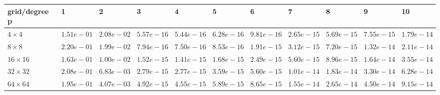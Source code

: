 \begin{tabular}{lllllllllll}
\hline
 grid/degree p   & 1          & 2          & 3          & 4          & 5          & 6          & 7          & 8          & 9          & 10         \\
\hline
 $4 \times 4$    & $1.51e-01$ & $2.08e-02$ & $5.57e-16$ & $5.44e-16$ & $6.28e-16$ & $9.81e-16$ & $2.65e-15$ & $5.69e-15$ & $7.55e-15$ & $1.79e-14$ \\
 $8 \times 8$    & $2.20e-01$ & $1.99e-02$ & $7.94e-16$ & $7.50e-16$ & $8.53e-16$ & $1.91e-15$ & $3.12e-15$ & $7.20e-15$ & $1.32e-14$ & $2.11e-14$ \\
 $16 \times 16$  & $1.63e-01$ & $1.00e-02$ & $1.52e-15$ & $1.41e-15$ & $1.68e-15$ & $2.49e-15$ & $5.60e-15$ & $8.96e-15$ & $1.64e-14$ & $3.55e-14$ \\
 $32 \times 32$  & $2.08e-01$ & $6.83e-03$ & $2.79e-15$ & $2.77e-15$ & $3.59e-15$ & $5.60e-15$ & $1.01e-14$ & $1.83e-14$ & $3.30e-14$ & $6.28e-14$ \\
 $64 \times 64$  & $1.95e-01$ & $4.07e-03$ & $4.92e-15$ & $4.55e-15$ & $5.89e-15$ & $8.65e-15$ & $1.55e-14$ & $2.65e-14$ & $4.50e-14$ & $9.15e-14$ \\
\hline
\end{tabular}